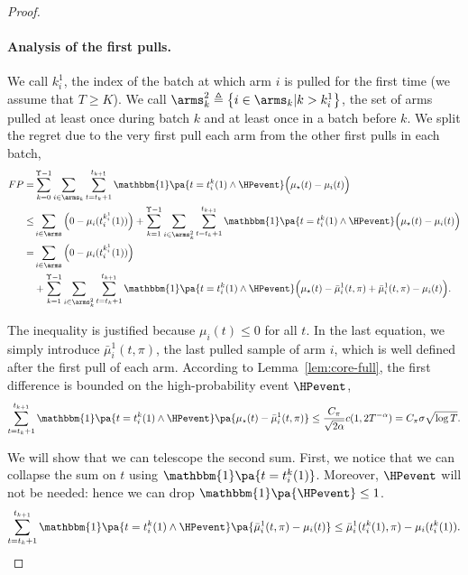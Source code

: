 \begin{proof}
\paragraph{Analysis of the first pulls.}

We call $k_i^1$, the index of the batch at which arm $i$ is pulled for the first time (we assume that $T\geq K$).  We call $\arms_k^2 \triangleq \left\{ i \in \arms_k | k > k_i^1\right\}$, the set of arms pulled at least once during batch $k$ and at least once in a batch before $k$. We split the regret due to the very first pull each arm from the other first pulls in each batch,
\begin{align*}
FP  = &\sum_{k=0}^{\Upsilon-1}\sum_{i\in\arms_k}\sum_{t=t_{k} +1 }^{t_{k+1}}  \mathbbm{1}\pa{ t = t_i^k(1) \land \HPevent}\Big(\mu_{\star}(t) - \mu_{i}(t)\Big)\\
\leq& \sum_{i \in \arms}  \Big(0- \mu_i(t_i^{k_i^1}(1))\Big) +  \sum_{k=1}^{\Upsilon -1} \sum_{i\in \arms_k^2}\sum_{t=t_k +1 }^{t_{k+1}}  \mathbbm{1}\pa{t = t_i^k(1) \land \HPevent}\Big(\mu_{\star}(t) - \mu_{i}(t)\Big)\\
 =& \sum_{i \in \arms} \Big(0- \mu_i(t_i^{k_i^1}(1))\Big) \\
& + \sum_{k=1}^{\Upsilon -1} \sum_{i\in \arms_k^2} \sum_{t=t_k +1 }^{t_{k+1}}  \mathbbm{1}\pa{ t = t_i^k(1) \land \HPevent}\Big(\mu_{\star}(t) - \bar{\mu}^1_i(t, \pi) + \bar{\mu}^1_i(t,\pi) - \mu_{i}(t)\Big).
\end{align*}

The inequality is justified because $\mu_i(t) \leq 0$ for all $t$. In the last equation, we simply introduce $\bar{\mu}^1_i(t,\pi)$, the last pulled sample of arm $i$, which is well defined after the first pull of each arm.
According to Lemma~\ref{lem:core-full}, the first difference is bounded on the high-probability event $\HPevent$,
\begin{equation}
    \label{eq:fp_lemma1}
    \sum_{t=t_k +1 }^{t_{k+1}} \mathbbm{1}\pa{t = t_i^k(1) \land \HPevent}\pa{\mu_{\star}(t) - \bar{\mu}^1_i(t, \pi)} \leq \frac{C_\pi}{\sqrt{2\alpha}} c(1,2T^{-\alpha}) = C_{\pi} \sigma \sqrt{\log{T}}.
\end{equation}


We will show that we can telescope the second sum. First, we notice that we can collapse the sum on $t$ using $ \mathbbm{1}\pa{t = t_i^k(1)}$. Moreover, $\HPevent$ will not be needed: hence we can drop $\mathbbm{1}\pa{\HPevent} \leq 1 $.
\begin{equation}
\label{eq:fp_collapse}
 \sum_{t=t_k +1 }^{t_{k+1}} \mathbbm{1}\pa{ t = t_i^k(1) \land \HPevent}\pa{\bar{\mu}^1_i(t,\pi) - \mu_{i}(t)} \leq \bar{\mu}^1_i(t_i^k(1), \pi) - \mu_{i}(t_i^k(1)).
\end{equation}


\end{proof}
